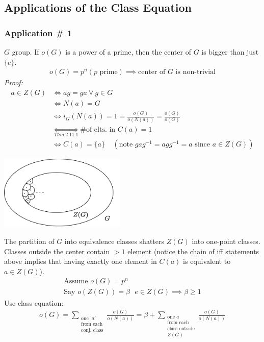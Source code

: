 \subsection*{Applications of the Class Equation}
\subsubsection*{Application \# 1}
\begin{theorem}
$G$ group. If $o(G)$ is a power of a prime, then the center of $G$ is bigger than just $\{e\}$.
\begin{align}
    o(G) = p^n (p \text{ prime}) \implies \text{center of }G \text{ is non-trivial} \nonumber
\end{align}
\textit{Proof:} 
\begin{align}
    a\in Z(G) &\iff ag=ga \ \forall \ g \in G \nonumber \\
    &\iff N(a)=G \nonumber \\
    &\iff i_G(N(a))=1 = \frac{o(G)}{o(N(a))}=\frac{o(G)}{o(G)} \nonumber \\
    &\underset{Thm \ 2.11.1}{\iff} \text{\# of elts. in }C(a) = 1 \nonumber \\
    &\iff C(a) = \{a\}  \ \ \ \ \ (\text{note }gag^{-1}=agg^{-1} = a \text{ since }a\in Z(G)) \nonumber
\end{align}
\begin{center}
    \includegraphics[width=0.45\textwidth]{Figures/shattered_center.png}
\end{center}
The partition of $G$ into equivalence classes shatters $Z(G)$ into one-point classes. Classes outside the center contain $>1$ element (notice the chain of iff statements above implies that having exactly one element in $C(a)$ is equivalent to $a\in Z(G)$).
\begin{align}
    \text{Assume } o(G)=p^n \nonumber \\
    \text{Say }o(Z(G))=\beta \ \ \ e\in Z(G) \implies \beta \geq 1 \nonumber
\end{align}
Use class equation:
\begin{align}
    o(G)= \sum_{\substack{\text{one  '}a'  \\\text{from each} \\ \text{conj. class}}} \frac{o(G)}{o(N(a))} = \beta + \sum_{\substack{\text{one $a$ } \\\text{from each }\\ \text{class outside} \\ Z(G)}} \frac{o(G)}{o(N(a))}\nonumber

\end{align}
\end{theorem}
